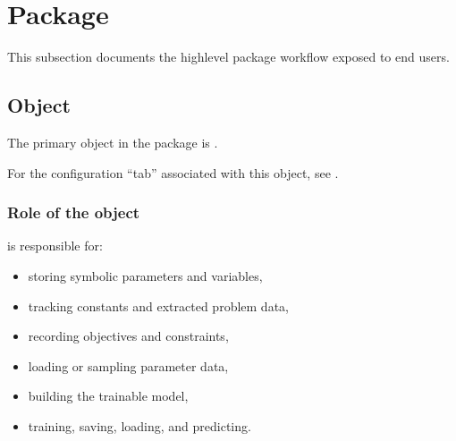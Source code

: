\documentclass[letterpaper,10pt,english,openany,oneside]{sphinxmanual}
\begin{document}
\sphinxstepscope


\section{Package}
\label{\detokenize{api/package/index:package}}\label{\detokenize{api/package/index::doc}}
\sphinxAtStartPar
This subsection documents the high\sphinxhyphen{}level package workflow exposed to end users.

\sphinxstepscope


\subsection{Object}
\label{\detokenize{api/package/object:object}}\label{\detokenize{api/package/object::doc}}
\sphinxAtStartPar
The primary object in the package is {\hyperref[\detokenize{api/package/object:nlpoptnet.api.NLPOptNet}]{}}.

\sphinxAtStartPar
For the configuration “tab” associated with this object, see {\hyperref[\detokenize{api/package/hyperparameters::doc}]{}}.


\subsubsection{Role of the object}
\label{\detokenize{api/package/object:role-of-the-object}}
\sphinxAtStartPar
{} is responsible for:
\begin{itemize}
\item {} 
\sphinxAtStartPar
storing symbolic parameters and variables,

\item {} 
\sphinxAtStartPar
tracking constants and extracted problem data,

\item {} 
\sphinxAtStartPar
recording objectives and constraints,

\item {} 
\sphinxAtStartPar
loading or sampling parameter data,

\item {} 
\sphinxAtStartPar
building the trainable model,

\item {} 
\sphinxAtStartPar
training, saving, loading, and predicting.

\end{itemize}
\end{document}
